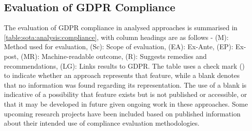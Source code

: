 \subsection{Evaluation of GDPR Compliance}\label{sota:analysis:compliance}
The evaluation of GDPR compliance in analysed approaches is summarised in \autoref{table:sota:analysis:compliance}, with column headings are as follows - (M): Method used for evaluation, (Sc): Scope of evaluation, (EA): Ex-Ante, (EP): Ex-post, (MR): Machine-readable outcome, (R): Suggests remedies and recommendations, (LG): Links results to GDPR.
The table uses a check mark (\cmark) to indicate whether an approach represents that feature, while a blank denotes that no information was found regarding its representation. The use of a blank is indicative of a possibility that feature exists but is not published or accessible, or that it may be developed in future given ongoing work in these approaches.
Some upcoming research projects have been included based on published information about their intended use of compliance evaluation methodologies.
